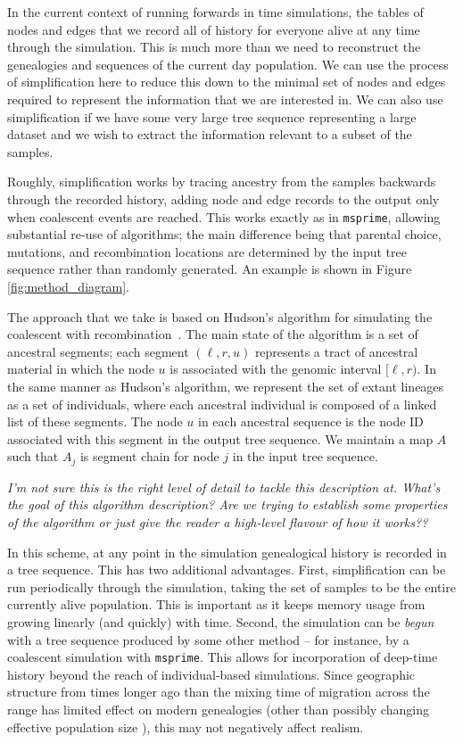 \documentclass{article}
\newcommand{\msprime}{\texttt{msprime}}
\newcommand{\jk}[1]{{\em \color{red} #1}}
\begin{document}
In the current context of running forwards in time simulations, the tables of
nodes and edges that we record all of history for everyone alive at any time through the simulation.
This is much more than we need to reconstruct the genealogies and sequences
of the current day population. We can use the process of simplification here to
reduce this down to the minimal set of nodes and edges required to represent
the information that we are interested in. We can also use simplification if  we have some very
large tree sequence representing a large dataset and we wish to extract the
information relevant to a subset of the samples.

Roughly, simplification works by tracing ancestry from the samples backwards
through the recorded history, adding node and edge records to the output
only when coalescent events are reached. This works exactly as in \msprime,
allowing substantial re-use of algorithms; the main difference being that
parental choice, mutations, and recombination locations are determined by the
input tree sequence rather than randomly generated. An example is shown in
Figure \ref{fig:method_diagram}.

The approach that we take is based on Hudson's algorithm for simulating
the coalescent with
recombination~\citep{hudson1983properties,kelleher2016efficient}. The main
state of the algorithm is a set of ancestral segments; each segment $(\ell, r,
u)$ represents a tract of ancestral material in which the node $u$ is
associated with the genomic interval $[\ell, r)$. In the same manner
as Hudson's algorithm, we represent the set of extant lineages as a
set of individuals, where each ancestral individual is composed of a
linked list of these segments. The node $u$ in each ancestral sequence
is the node ID associated with this segment in the output tree sequence.
We maintain a map $A$ such that $A_j$ is segment chain for node $j$ in
the input tree sequence.

\jk{I'm not sure this is the right level of detail to tackle this description
at. What's the goal of this algorithm description? Are we trying to
establish some properties of the algorithm or just give the reader a high-level
flavour of how it works??}

In this scheme, at any point in the simulation genealogical history is recorded
in a tree sequence. This has two additional advantages. First, simplification
can be run periodically through the simulation, taking the set of samples to be
the entire currently alive population. This is important as it keeps memory
usage from growing linearly (and quickly) with time. Second, the simulation can
be \emph{begun} with a tree sequence produced by some other method -- for
instance, by a coalescent simulation with \msprime. This allows for
incorporation of deep-time history beyond the reach of individual-based
simulations. Since geographic structure from times longer ago than the mixing
time of migration across the range has limited effect on modern genealogies
\citep{wilkins_separation} (other than possibly changing effective population
size \citet{durretspatial}), this may not negatively affect realism.
\end{document}
